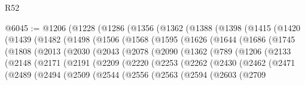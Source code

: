 \begin{lexlean}{R52}
\begin{coremodule}
@6045 := @1206
    (@1228
      (@1286
        (@1356
          (@1362
            (@1388
              (@1398
                (@1415
                  (@1420
                    (@1439
                      (@1482
                        (@1498
                          (@1506
                            (@1568
                              (@1595
                                (@1626
                                  (@1644
                                    (@1686
                                      (@1745
                                        (@1808
                                          (@2013
                                            (@2030
                                              (@2043
                                                (@2078
                                                  (@2090
                                                    (@1362
                                                      (@789
                                                        (@1206
                                                          (@2133
                                                            (@2148
                                                              (@2171
                                                                (@2191
                                                                  (@2209
                                                                    (@2220
                                                                      (@2253
                                                                        (@2262
                                                                          (@2430
                                                                            (@2462
                                                                              (@2471
                                                                                (@2489
                                                                                  (@2494
                                                                                    (@2509
                                                                                      (@2544
                                                                                        (@2556
                                                                                          (@2563
                                                                                            (@2594
                                                                                              (@2603
                                                                                                (@2709

\end{coremodule}
\end{lexlean}
